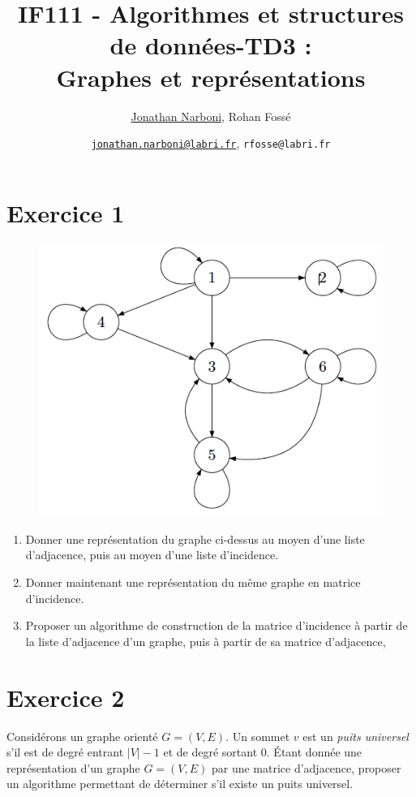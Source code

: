 \documentclass[10pt,a4paper]{article}
\title{IF111 - Algorithmes et structures de données-TD3 :\\ Graphes et représentations}
\date{}
\author{\underline{Jonathan Narboni}, Rohan Fossé}
\date{\underline{\texttt{jonathan.narboni@labri.fr}}, \texttt{rfosse@labri.fr}}
\begin{document}
\maketitle

\section*{Exercice 1}
\begin{figure}[h]
    \centering
    \includegraphics[scale=0.3]{Graphe1.png}
    \label{fig:my_label}
\end{figure}
\begin{enumerate}
    \item Donner une représentation du graphe ci-dessus au moyen d'une liste d'adjacence, puis au moyen d'une liste d'incidence.
    \item Donner maintenant une représentation du même graphe en matrice d'incidence.%
    \item Proposer un algorithme de construction de la matrice d'incidence à partir de la liste d'adjacence d'un graphe, puis à partir de sa matrice d'adjacence,
\end{enumerate}


\section*{Exercice 2}
Considérons un graphe orienté $G = (V, E)$. Un sommet $v$ est un \textit{puits universel} s'il est de degré entrant $|V| - 1$ et de degré sortant 0.
Étant donnée une représentation d'un graphe $G = (V, E)$ par une matrice d'adjacence, proposer un algorithme permettant de déterminer s'il existe un puits universel.
\end{document}

